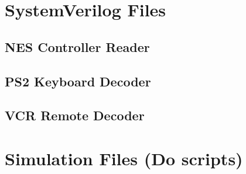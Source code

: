 \documentclass[a4paper]{article}
\makeatletter
\newcommand{\filecaption}[1]{\filename@parse{#1}\filename@base.\filename@ext}
\newcommand{\filelisting}[2][]{%
}
\makeatother
\begin{document}
\section{SystemVerilog Files}
\filelisting[label=lst:sv_toplevel]{../verilog/final_project.sv}
\filelisting[label=lst:sv_devices_mux]{../verilog/devices_mux.sv}

\subsection{NES Controller Reader}
\filelisting[label=lst:sv_nes_dp_nes]{../verilog/nes/DP_NES.sv}

\subsection{PS2 Keyboard Decoder}
\filelisting[label=lst:sv_ps2_ps_2]{../verilog/ps2/PS_2.v}
\filelisting[label=lst:sv_ps2_data_received]{../verilog/ps2/data_received.v}
\filelisting[label=lst:sv_ps2_sync_ps2]{../verilog/ps2/sync_ps2.sv}
\filelisting[label=lst:sv_ps2_valid]{../verilog/ps2/valid.sv}
\filelisting[label=lst:sv_ps2_compare]{../verilog/ps2/compare.sv}
\filelisting[label=lst:sv_ps2_encounter]{../verilog/ps2/encounter.sv}
\filelisting[label=lst:sv_ps2_sevenseg]{../verilog/ps2/sevenseg.sv}
\filelisting[label=lst:sv_ps2_checker]{../verilog/ps2/checker.v}
\filelisting[label=lst:sv_ps2_message]{../verilog/ps2/message.sv}

\subsection{VCR Remote Decoder}
\filelisting[label=lst:sv_vcr_ir_decoder]{../verilog/vcr_remote/ir_decoder.sv}
\filelisting[label=lst:sv_vcr_ir_signal_transcriber]{../verilog/vcr_remote/ir_signal_transcriber.sv}
\filelisting[label=lst:sv_vcr_sync_counter]{../verilog/vcr_remote/sync_counter.sv}
\filelisting[label=lst:sv_vcr_counter]{../verilog/vcr_remote/counter.sv}
\filelisting[label=lst:sv_vcr_sync]{../verilog/vcr_remote/sync.sv}
\filelisting[label=lst:sv_vcr_shiftreg]{../verilog/vcr_remote/shiftreg.sv}
\filelisting[label=lst:sv_vcr_checksum_validator]{../verilog/vcr_remote/checksum_validator.sv}
\filelisting[label=lst:sv_vcr_ir_code_decoder]{../verilog/vcr_remote/ir_code_decoder.sv}

\section{Simulation Files (Do scripts)}
\filelisting[label=lst:sim_devices_mux]{../do_files/devices_mux.do}
\end{document}

